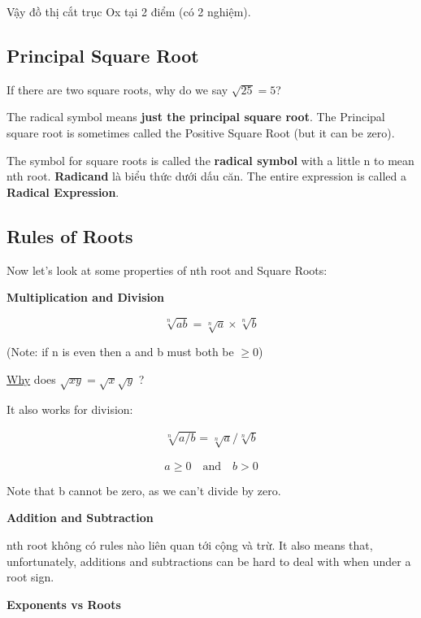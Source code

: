Vậy đồ thị cắt trục Ox tại 2 điểm (có 2 nghiệm).

\subsection{Principal Square Root}

If there are two square roots, why do we say $\sqrt{25}=5$?

The radical symbol means \textbf{just the principal square root}. The Principal square root is sometimes called the Positive Square Root (but it can be zero).

The symbol for square roots \q{\(\sqrt{}\)} is called the \textbf{radical symbol} with a little n to mean nth root. \textbf{Radicand} là biểu thức dưới dấu căn. The entire expression is called a \textbf{Radical Expression}.

\subsection{Rules of Roots}

Now let's look at some properties of nth root and Square Roots:

\textbf{Multiplication and Division}

\begin{equation}
  \sqrt[n]{ab}=\sqrt[n]{a} \times \sqrt[n]{b}
\end{equation}

(Note: if n is even then a and b must both be \(\geq 0\))

\href{https://www.mathsisfun.com/algebra/square-root.html}{Why} does $\sqrt{xy}=\sqrt{x}\sqrt{y}$ ?

It also works for division:

\begin{equation}
  \begin{aligned}
    \sqrt[n]{a/b}=\sqrt[n]{a}/\sqrt[n]{b}
  \end{aligned}
\end{equation}

\[a \geq 0 \quad \text{and} \quad b > 0\]

Note that b cannot be zero, as we can't divide by zero.

\textbf{Addition and Subtraction}

nth root không có rules nào liên quan tới cộng và trừ. It also means that, unfortunately, additions and subtractions can be hard to deal with when under a root sign.

\textbf{Exponents vs Roots}

